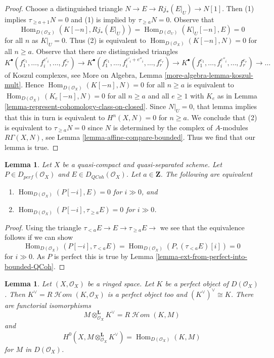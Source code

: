 \documentclass{amsart}
\theoremstyle{plain}
\newtheorem{lemma}[subsection]{Lemma}
\theoremstyle{definition}
\theoremstyle{remark}
\numberwithin{equation}{subsection}
\def\Hom{\mathop{\mathrm{Hom}}\nolimits}
\def\SheafHom{\mathop{\mathcal{H}\!\mathit{om}}\nolimits}
\def\QCoh{\mathit{QCoh}}
\begin{document}
\begin{proof}
Choose a distinguished triangle $N \to E \to Rj_*(E|_U) \to N[1]$.
Then (1) implies $\tau_{\geq a + 1} N = 0$ and (1) is implied by
$\tau_{\geq a}N = 0$. Observe that
$$
\Hom_{D(\mathcal{O}_X)}(K[-n], Rj_*(E|_U)) =
\Hom_{D(\mathcal{O}_U)}(K|_U[-n], E) = 0
$$
for all $n$ as $K|_U = 0$. Thus (2) is equivalent to
$\Hom_{D(\mathcal{O}_X)}(K[-n], N) = 0$ for all $n \geq a$. 
Observe that there are distinguished triangles
$$
K^\bullet(f_1^{e_1}, \ldots, f_i^{e'_i}, \ldots, f_r^{e_r}) \to
K^\bullet(f_1^{e_1}, \ldots, f_i^{e'_i + e''_i}, \ldots, f_r^{e_r}) \to
K^\bullet(f_1^{e_1}, \ldots, f_i^{e''_i}, \ldots, f_r^{e_r}) \to \ldots
$$
of Koszul complexes, see
More on Algebra, Lemma \ref{more-algebra-lemma-koszul-mult}. Hence
$\Hom_{D(\mathcal{O}_X)}(K[-n], N) = 0$ for all $n \geq a$
is equivalent to
$\Hom_{D(\mathcal{O}_X)}(K_e[-n], N) = 0$ for all $n \geq a$ and
all $e \geq 1$ with $K_e$ as in
Lemma \ref{lemma-represent-cohomology-class-on-closed}.
Since $N|_U = 0$, that lemma implies that this in turn is equivalent to
$H^n(X, N) = 0$ for $n \geq a$. We conclude that (2) is equivalent
to $\tau_{\geq a}N = 0$ since $N$ is determined by the complex of
$A$-modules $R\Gamma(X, N)$, see Lemma \ref{lemma-affine-compare-bounded}.
Thus we find that our lemma is true.
\end{proof}


\begin{lemma}
\label{lemma-bounded-truncation}
Let $X$ be a quasi-compact and quasi-separated scheme.
Let $P \in D_{perf}(\mathcal{O}_X)$ and $E \in D_{\QCoh}(\mathcal{O}_X)$. 
Let $a \in \mathbf{Z}$. The following are equivalent
\begin{enumerate}
\item $\Hom_{D(\mathcal{O}_X)}(P[-i], E) = 0$ for $i \gg 0$, and
\item $\Hom_{D(\mathcal{O}_X)}(P[-i], \tau_{\geq a} E) = 0$ for $i \gg 0$.
\end{enumerate}
\end{lemma}

\begin{proof}
Using the triangle $ \tau_{< a} E \to E \to \tau_{\geq a} E \to$
we see that the equivalence follows if we can show
$$
\Hom_{D(\mathcal{O}_X)}(P[-i], \tau_{< a} E) =
\Hom_{D(\mathcal{O}_X)}(P, (\tau_{< a} E)[i]) = 0 
$$
for $i \gg 0$. As $P$ is perfect this is true by
Lemma \ref{lemma-ext-from-perfect-into-bounded-QCoh}.
\end{proof}


\begin{lemma}
\label{cohomology-lemma-dual-perfect-complex}
Let $(X, \mathcal{O}_X)$ be a ringed space. Let $K$ be a perfect object of
$D(\mathcal{O}_X)$. Then $K^\vee = R\SheafHom(K, \mathcal{O}_X)$ is a
perfect object too and $(K^\vee)^\vee \cong K$. There are
functorial isomorphisms
$$
M \otimes^\mathbf{L}_{\mathcal{O}_X} K^\vee = R\SheafHom(K, M)
$$
and
$$
H^0(X, M \otimes^\mathbf{L}_{\mathcal{O}_X} K^\vee) =
\Hom_{D(\mathcal{O}_X)}(K, M)
$$
for $M$ in $D(\mathcal{O}_X)$.
\end{lemma}
\end{document}
